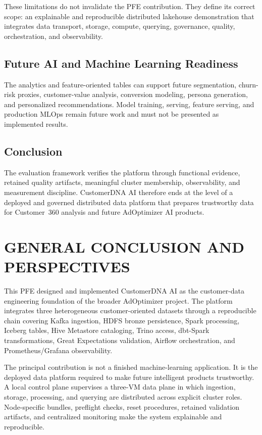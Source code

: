 These limitations do not invalidate the PFE contribution. They define its correct scope: an explainable and reproducible distributed lakehouse demonstration that integrates data transport, storage, compute, querying, governance, quality, orchestration, and observability.

\section{Future AI and Machine Learning Readiness}
The analytics and feature-oriented tables can support future segmentation, churn-risk proxies, customer-value analysis, conversion modeling, persona generation, and personalized recommendations. Model training, serving, feature serving, and production MLOps remain future work and must not be presented as implemented results.

\section{Conclusion}
The evaluation framework verifies the platform through functional evidence, retained quality artifacts, meaningful cluster membership, observability, and measurement discipline. CustomerDNA AI therefore ends at the level of a deployed and governed distributed data platform that prepares trustworthy data for Customer~360 analysis and future AdOptimizer AI products.

\clearpage
\chapter*{GENERAL CONCLUSION AND PERSPECTIVES}

This PFE designed and implemented CustomerDNA AI as the customer-data engineering foundation of the broader AdOptimizer project. The platform integrates three heterogeneous customer-oriented datasets through a reproducible chain covering Kafka ingestion, HDFS bronze persistence, Spark processing, Iceberg tables, Hive Metastore cataloging, Trino access, dbt-Spark transformations, Great Expectations validation, Airflow orchestration, and Prometheus/Grafana observability.

The principal contribution is not a finished machine-learning application. It is the deployed data platform required to make future intelligent products trustworthy. A local control plane supervises a three-VM data plane in which ingestion, storage, processing, and querying are distributed across explicit cluster roles. Node-specific bundles, preflight checks, reset procedures, retained validation artifacts, and centralized monitoring make the system explainable and reproducible.

